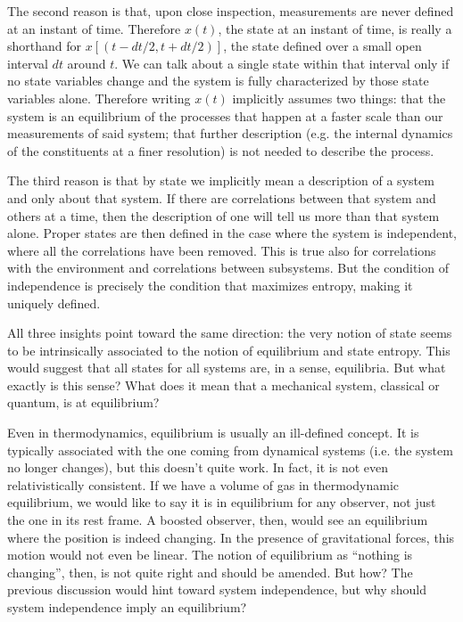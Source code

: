 \documentclass[letterpaper,twocolumn]{article}
\begin{document}
The second reason is that, upon close inspection, measurements are never defined at an instant of time. Therefore $x(t)$, the state at an instant of time, is really a shorthand for $x[(t - dt/2, t + dt/2)]$, the state defined over a small open interval $dt$ around $t$. We can talk about a single state within that interval only if no state variables change and the system is fully characterized by those state variables alone. Therefore writing $x(t)$ implicitly assumes two things: that the system is an equilibrium of the processes that happen at a faster scale than our measurements of said system; that further description (e.g. the internal dynamics of the constituents at a finer resolution) is not needed to describe the process.

The third reason is that by state we implicitly mean a description of a system and only about that system. If there are correlations between that system and others at a time, then the description of one will tell us more than that system alone. Proper states are then defined in the case where the system is independent, where all the correlations have been removed. This is true also for correlations with the environment and correlations between subsystems. But the condition of independence is precisely the condition that maximizes entropy, making it uniquely defined. 

All three insights point toward the same direction: the very notion of state seems to be intrinsically associated to the notion of equilibrium and state entropy. This would suggest that all states for all systems are, in a sense, equilibria. But what exactly is this sense?  What does it mean that a mechanical system, classical or quantum, is at equilibrium?

Even in thermodynamics, equilibrium is usually an ill-defined concept. It is typically associated with the one coming from dynamical systems (i.e. the system no longer changes), but this doesn't quite work. In fact, it is not even relativistically consistent. If we have a volume of gas in thermodynamic equilibrium, we would like to say it is in equilibrium for any observer, not just the one in its rest frame. A boosted observer, then, would see an equilibrium where the position is indeed changing. In the presence of gravitational forces, this motion would not even be linear. The notion of equilibrium as ``nothing is changing'', then, is not quite right and should be amended. But how? The previous discussion would hint toward system independence, but why should system independence imply an equilibrium?
\end{document}
